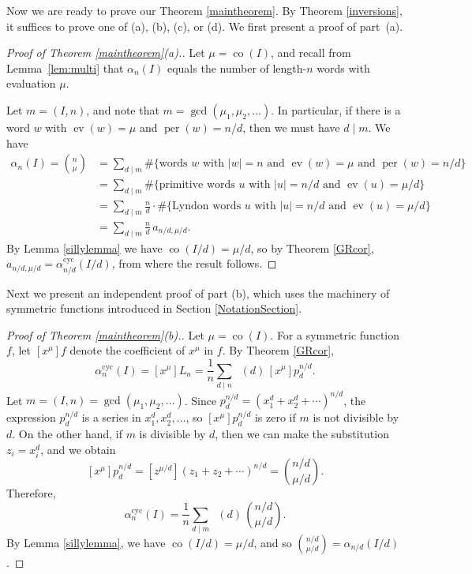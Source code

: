 \documentclass[12pt]{article}
\newcommand{\alphacyc}{\alpha^{\text{cyc}}}
\DeclareMathOperator{\mob}{M\ddot{o}b}
\DeclareMathOperator{\per}{per}
\DeclareMathOperator{\ev}{ev}
\DeclareMathOperator{\co}{co}
\theoremstyle{definition}
\begin{document}
Now we are ready to prove our Theorem \ref{maintheorem}. By Theorem \ref{inversions}, it suffices to prove one of (a), (b), (c), or (d). We first present a proof of part~(a).

\begin{proof}[Proof of Theorem \ref{maintheorem}(a).] Let $\mu = \co(I)$, and recall from Lemma~\ref{lem:multi} that $\alpha_n(I)$ equals the number of length-$n$ words with evaluation $\mu$.

Let $m = (I,n)$, and note that $m = \gcd(\mu_1,\mu_2,\ldots)$. In particular, if there is a word $w$ with $\ev(w) = \mu$ and $\per(w) = n/d$, then we must have $d \mid m$. We have
\begin{align*}
\alpha_n(I) = \binom{n}{\mu} &= \sum_{\text{$d \mid m$}} \#\{\text{words $w$ with $|w| = n$ and $\ev(w) = \mu$ and $\per(w) = n/d$}\} \\
&= \sum_{\text{$d \mid m$}} \#\{\text{primitive words $u$ with $|u| = n/d$ and $\ev(u) = \mu/d$}\} \\
&= \sum_{\text{$d \mid m$}} \frac{n}{d} \cdot \#\{\text{Lyndon words $u$ with $|u| = n/d$ and $\ev(u) = \mu/d$}\} \\
&= \sum_{\text{$d \mid m$}} \frac{n}{d}\, a_{n/d,\mu/d}.
\end{align*}
By Lemma \ref{sillylemma} we have $\co(I/d) = \mu/d$, so by Theorem \ref{GRcor}, $a_{n/d,\mu/d} = \alphacyc_{n/d}(I/d)$, from where the result follows.\end{proof}

Next we present an independent proof of part (b), which uses the machinery of symmetric functions introduced in Section \ref{NotationSection}.

\begin{proof}[Proof of Theorem \ref{maintheorem}(b).] Let $\mu = \co(I)$. For a symmetric function $f$, let $[x^\mu] f$ denote the coefficient of $x^\mu$ in $f$. By Theorem \ref{GRcor},
\[ \alphacyc_n(I) = [x^\mu]L_n = \frac{1}{n}\sum_{\text{$d \mid n$}} \mob(d)\, [x^\mu]p_d^{n/d}. \]
Let $m = (I,n) = \gcd(\mu_1,\mu_2,\ldots)$. Since $p_d^{n/d} = {\left(x_1^d + x_2^d + \cdots\right)}^{n/d}$, the expression $p_d^{n/d}$ is a series in $x_1^d, x_2^d, \ldots$, so $[x^\mu]p_d^{n/d}$ is zero if $m$ is not divisible by $d$. On the other hand, if $m$ is divisible by $d$, then we can make the substitution $z_i = x_i^d$, and we obtain
\[ [x^\mu]p_d^{n/d} = [z^{\mu/d}]{\left(z_1 + z_2 + \cdots\right)}^{n/d} = \binom{n/d}{\mu/d}. \]
Therefore,
\[ \alphacyc_n(I) = \frac{1}{n}\sum_{\text{$d\mid m$}} \mob(d)\,\binom{n/d}{\mu/d}. \]
By Lemma \ref{sillylemma}, we have $\co(I/d) = \mu/d$, and so $\binom{n/d}{\mu/d} = \alpha_{n/d}(I/d)$.
\end{proof}
\end{document}
